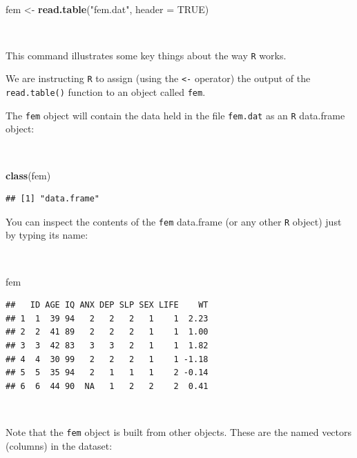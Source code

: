 \documentclass[12pt,a4paper]{book}
\newenvironment{Shaded}{\begin{snugshade}}{\end{snugshade}}
\newcommand{\KeywordTok}[1]{\textcolor[rgb]{0.13,0.29,0.53}{\textbf{#1}}}
\newcommand{\DataTypeTok}[1]{\textcolor[rgb]{0.13,0.29,0.53}{#1}}
\newcommand{\StringTok}[1]{\textcolor[rgb]{0.31,0.60,0.02}{#1}}
\newcommand{\OtherTok}[1]{\textcolor[rgb]{0.56,0.35,0.01}{#1}}
\newcommand{\NormalTok}[1]{#1}
\theoremstyle{definition}
\theoremstyle{definition}
\theoremstyle{definition}
\theoremstyle{remark}
\begin{document}
~

\begin{Shaded}
\begin{Highlighting}[]
\NormalTok{fem <-}\StringTok{ }\KeywordTok{read.table}\NormalTok{(}\StringTok{"fem.dat"}\NormalTok{, }\DataTypeTok{header =} \OtherTok{TRUE}\NormalTok{)}
\end{Highlighting}
\end{Shaded}

~

This command illustrates some key things about the way \texttt{R} works.

We are instructing \texttt{R} to assign (using the \texttt{\textless{}-}
operator) the output of the \texttt{read.table()} function to an object
called \texttt{fem}.

The \texttt{fem} object will contain the data held in the file
\texttt{fem.dat} as an \texttt{R} data.frame object:

~

\begin{Shaded}
\begin{Highlighting}[]
\KeywordTok{class}\NormalTok{(fem)}
\end{Highlighting}
\end{Shaded}

\begin{verbatim}
## [1] "data.frame"
\end{verbatim}

\newpage

You can inspect the contents of the \texttt{fem} data.frame (or any
other \texttt{R} object) just by typing its name:

~

\begin{Shaded}
\begin{Highlighting}[]
\NormalTok{fem}
\end{Highlighting}
\end{Shaded}

\begin{verbatim}
##   ID AGE IQ ANX DEP SLP SEX LIFE    WT
## 1  1  39 94   2   2   2   1    1  2.23
## 2  2  41 89   2   2   2   1    1  1.00
## 3  3  42 83   3   3   2   1    1  1.82
## 4  4  30 99   2   2   2   1    1 -1.18
## 5  5  35 94   2   1   1   1    2 -0.14
## 6  6  44 90  NA   1   2   2    2  0.41
\end{verbatim}

~

Note that the \texttt{fem} object is built from other objects. These are
the named vectors (columns) in the dataset:
\end{document}
